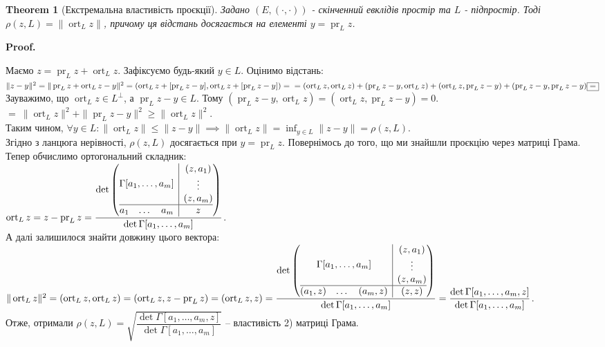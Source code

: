 \documentclass[a4paper, 10pt]{article}
\makeatletter
\theoremstyle{theoremdd}
\newtheorem{theorem}{Theorem}[subsection]
\DeclareMathOperator{\ort}{ort}
\DeclareMathOperator{\pr}{pr}
\renewenvironment{proof}[1][Proof.\\]{\par
\pushQED{\hfill \qed}%
\normalfont \topsep6\p@\@plus6\p@\relax
\trivlist
\item\relax
{\bfseries
#1\@addpunct{.}}\hspace\labelsep\ignorespaces
}{%
\popQED\endtrivlist\@endpefalse
}
\makeatother
\begin{document}
\begin{theorem}[Екстремальна властивість проєкції]
Задано $(E,(\cdot,\cdot))$ - скінченний евклідів простір та $L$ - підпростір. Тоді $\rho(z,L) = \| \ort_L z \|$, причому ця відстань досягається на елементі $y = \pr_L z$.
\end{theorem}

\begin{proof}
Маємо $z = \pr_L z + \ort_L z$. Зафіксуємо будь-який $y \in L$. Оцінимо відстань:\\
$\|z-y\|^2 = \|\pr_L z + \ort_L z - y\|^2 = (\ort_L z + [\pr_L z - y], \ort_L z + [\pr_L z - y]) = \\ = (\ort_L z, \ort_L z) + (\pr_L z - y,\ort_L z) + (\ort_L z,\pr_L z - y) + (\pr_L z-y, \pr_L z-y) \boxed{=}$\\
Зауважимо, що $\ort_L z \in L^\perp$, а $\pr_L z - y \in L$. Тому $(\pr_L z-y,\ort_L z) = (\ort_L z, \pr_L z -y) = 0$.\\
$\boxed{=} \ \|\ort_L z\|^2 + \|\pr_L z - y\|^2 \geq \|\ort_L z\|^2$.\\
Таким чином, $\forall y \in L: \|\ort_L z\| \leq \|z-y\| \implies \|\ort_L z\| = \displaystyle\inf_{y \in L} \|z-y\| = \rho(z,L)$.\\
Згідно з ланцюга нерівності, $\rho (z,L)$ досягається при $y = \pr_L z$.
\end{proof}
\noindent
Повернімось до того, що ми знайшли проєкцію через матриці Грама. Тепер обчислимо ортогональний складник: \\
$\ort_L z = z - \pr_L z = \dfrac{\det \left(\begin{array}{@{}c|c@{}}
\Gamma[a_1,\dots,a_m] & \begin{matrix} (z,a_1) \\ \vdots \\ (z,a_m) \end{matrix} \\
\hline
\begin{matrix} a_1 & \dots & a_m \end{matrix} & z
\end{array}\right)}{\det\Gamma[a_1,\dots,a_m]}$.\\
А далі залишилося знайти довжину цього вектора:\\
$\| \ort_L z\|^2 = (\ort_L z, \ort_L z) = (\ort_L z, z - \pr_L z) = (\ort_L z, z)= \dfrac{\det \left(\begin{array}{@{}c|c@{}}
\Gamma[a_1,\dots,a_m] & \begin{matrix} (z,a_1) \\ \vdots \\ (z,a_m) \end{matrix} \\
\hline
\begin{matrix} (a_1,z) & \dots & (a_m,z) \end{matrix} & (z,z)
\end{array}\right)}{\det\Gamma[a_1,\dots,a_m]} = \dfrac{\det\Gamma[a_1,\dots,a_m,z]}{\det\Gamma[a_1,\dots,a_m]}$.\\
Отже, отримали $\rho(z,L) = \sqrt{\dfrac{\det\Gamma[a_1,\dots,a_m,z]}{\det\Gamma[a_1,\dots,a_m]}}$ -- властивість 2) матриці Грама.
\end{document}

